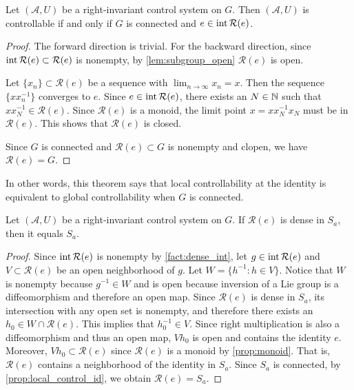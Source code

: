 \documentclass[12pt,class=article,crop=false]{standalone}
\begin{document}
\begin{proposition} \label{prop:local_control_id} 
Let $ (\mathcal{A},U)$ be a right-invariant control system on $G$. Then $ ( \mathcal{ A},U)$ is controllable if and only if $ G$ is connected and  $ e \in \operatorname{int} \mathcal{R}( e) $.
\end{proposition}
\begin{proof}
The forward direction is trivial. For the backward direction, since $ \operatorname{int} \mathcal{R}( e)  \subset \mathcal{R}( e) $ is nonempty, by \cref{lem:subgroup_open} $ \mathcal{R}( e) $ is open.

Let $ \{x_n\} \subset \mathcal{R}( e) $ be a sequence with $ \lim_{ n \to \infty} x_n = x$. Then the sequence $ \{x x_n ^{-1}\} $ converges to $ e$. Since $ e \in \operatorname{int} \mathcal{R}( e) $, there exists an $ N \in \mathbb{N}$ such that $ x x_N ^{-1} \in \mathcal{R}( e) $. Since $ \mathcal{R}( e) $ is a monoid, the limit point $ x = x x_N ^{-1} x_N $ must be in $\mathcal{R}( e) $. This shows that $ \mathcal{R}( e) $ is closed.

Since $ G$ is connected and  $ \mathcal{R}( e) \subset G $ is nonempty and clopen, we have $ \mathcal{R}( e) = G $.
\end{proof}
In other words, this theorem says that local controllability at the identity is equivalent to global controllability when $ G$ is connected.
\begin{lemma}
Let $ (\mathcal{A},U)$ be a right-invariant control system on $G$. If $ \mathcal{R}( e) $ is dense in $ S_a$, then it equals $ S_a$.
\end{lemma}
\begin{proof}
Since $ \operatorname{int} \mathcal{R}( e) $ is nonempty by \cref{fact:dense_int}, let $ g \in \operatorname{int} \mathcal{R}( e) $ and $ V \subset \mathcal{R}( e) $ be an open neighborhood of $ g$. Let $ W = \{h^{-1}: h \in V\} $. Notice that $ W$ is nonempty because $ g^{-1} \in W$ and is open because inversion of a Lie group is a diffeomorphism and therefore an open map. Since $ \mathcal{R}( e) $ is dense in $ S_a$, its intersection with any open set is nonempty, and therefore there exists an $ h_0 \in W \cap \mathcal{R}( e) $. This implies that $ h_0^{-1} \in V$. Since right multiplication is also a diffeomorphism and thus an open map, $ Vh_0$ is open and contains the identity $ e$. Moreover, $ Vh_0 \subset \mathcal{R}( e) $ since $ \mathcal{R}( e) $ is a monoid by \cref{prop:monoid}. That is, $ \mathcal{R}( e) $ contains a neighborhood of the identity in $ S_a$. Since  $ S_a$ is connected, by \cref{prop:local_control_id}, we obtain  $ \mathcal{R}( e) = S_a $.
\end{proof}
\end{document}
